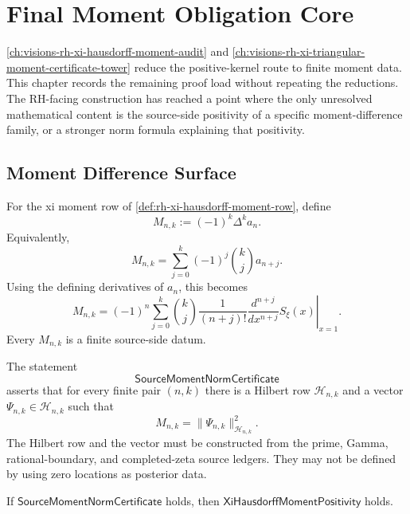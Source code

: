 \chapter{Final Moment Obligation Core}
\label{ch:visions-rh-final-moment-obligation-core}

\autoref{ch:visions-rh-xi-hausdorff-moment-audit} and
\autoref{ch:visions-rh-xi-triangular-moment-certificate-tower} reduce the
positive-kernel route to finite moment data. This chapter records the
remaining proof load without repeating the reductions. The RH-facing
construction has reached a point where the only unresolved mathematical
content is the source-side positivity of a specific moment-difference
family, or a stronger norm formula explaining that positivity.

\section{Moment Difference Surface}
\label{sec:rh-final-moment-difference-surface}

\begin{definition}
\label{def:rh-final-moment-difference}
For the xi moment row of
\autoref{def:rh-xi-hausdorff-moment-row}, define
$$
M_{n,k}
:=
(-1)^k\Delta^k a_n.
$$
Equivalently,
$$
M_{n,k}
=
\sum_{j=0}^{k}
(-1)^j
\binom{k}{j}
a_{n+j}.
$$
Using the defining derivatives of $a_n$, this becomes
$$
M_{n,k}
=
(-1)^n
\sum_{j=0}^{k}
\binom{k}{j}
\frac{1}{(n+j)!}
\left.
\frac{d^{n+j}}{dx^{n+j}}S_{\xi}(x)
\right|_{x=1}.
$$
Every $M_{n,k}$ is a finite source-side datum.
\end{definition}

\begin{definition}
\label{def:rh-source-moment-norm-certificate}
The statement
$$
\mathsf{SourceMomentNormCertificate}
$$
asserts that for every finite pair $(n,k)$ there is a Hilbert row
$\mathcal H_{n,k}$ and a vector $\Psi_{n,k}\in\mathcal H_{n,k}$ such
that
$$
M_{n,k}
=
\|\Psi_{n,k}\|_{\mathcal H_{n,k}}^2.
$$
The Hilbert row and the vector must be constructed from the
prime, Gamma, rational-boundary, and completed-zeta source ledgers. They
may not be defined by using zero locations as posterior data.
\end{definition}

\begin{theorem}
\label{thm:rh-source-moment-norm-certificate-implies-hausdorff}
If $\mathsf{SourceMomentNormCertificate}$ holds, then
$\mathsf{XiHausdorffMomentPositivity}$ holds.
\end{theorem}

